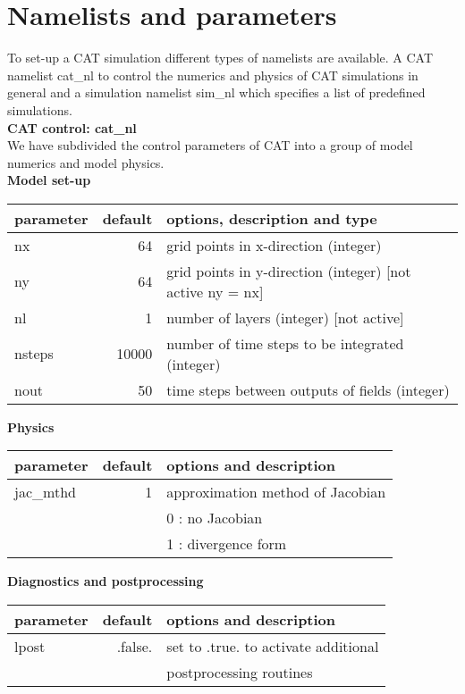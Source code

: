 \chapter{Namelists and parameters}
To set-up a CAT simulation different types of namelists are available. 
A CAT namelist cat{\_}nl to control the numerics and physics of CAT
simulations in general and a simulation namelist sim{\_}nl which specifies 
a list of predefined simulations.\\ 

\noindent
{\bf \Large CAT control: cat{\_}nl} \\
\noindent
We have subdivided the control parameters of CAT into a group of model
numerics and model physics. \\

\noindent
{\bf Model set-up} \\ 
\noindent
\begin{tabular}{|l|r|l|}
 \hline
 parameter & default & options, description and type \\
 \hline
 nx      &   64       & grid points in x-direction (integer) \\
 ny      &   64       & grid points in y-direction (integer) [not active ny = nx] \\
 nl      &   1        & number of layers (integer) [not active]  \\
 nsteps  &   10000    & number of time steps to be integrated (integer) \\
 nout    &   50       & time steps between outputs of fields (integer) \\
 \hline
\end{tabular} 

\vspace{0.5cm}

\noindent
{\bf Physics} \\ 
\noindent
\begin{tabular}{|l|r|l|}
 \hline
 parameter & default & options and description \\
 \hline
 jac{\_}mthd  &  1       & approximation method of Jacobian  \\
              &          & 0 : no Jacobian  \\
              &          & 1 : divergence form \\
 \hline
\end{tabular}

\vspace{0.5cm}

\noindent
{\bf Diagnostics and postprocessing} \\
\noindent
\begin{tabular}{|l|r|l|}
 \hline
 parameter & default & options and description \\
 \hline
 lpost        &  .false. & set to .true. to activate additional  \\
              &          & postprocessing routines               \\
 \hline
\end{tabular}

